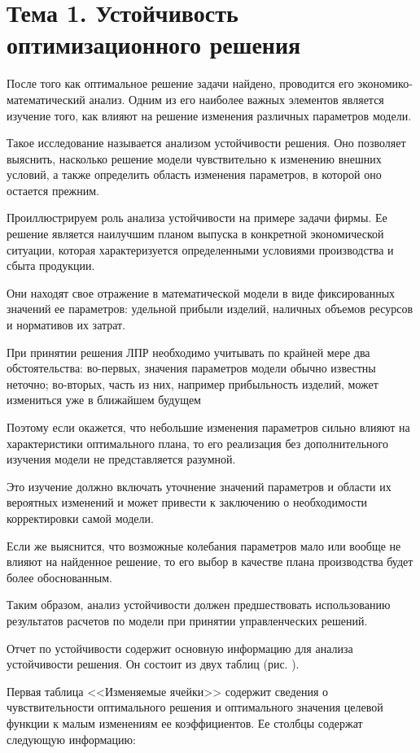 \section{Тема 1. Устойчивость оптимизационного решения}

После того как оптимальное решение задачи найдено, проводится его экономико-математический анализ. Одним из его наиболее важных элементов является изучение того, как влияют на решение изменения различных параметров модели.

Такое исследование называется анализом устойчивости решения. Оно позволяет выяснить, насколько решение модели чувствительно к изменению внешних условий, а также определить область изменения параметров, в которой оно остается прежним.

Проиллюстрируем роль анализа устойчивости на примере задачи фирмы. Ее решение является наилучшим планом выпуска в конкретной экономической ситуации, которая характеризуется определенными условиями производства и сбыта продукции.

Они находят свое отражение в математической модели в виде фиксированных значений ее параметров: удельной прибыли изделий, наличных объемов ресурсов и нормативов их затрат.

При принятии решения ЛПР необходимо учитывать по крайней мере два обстоятельства: во-первых, значения параметров модели обычно известны неточно; во-вторых, часть из них, например прибыльность изделий, может измениться уже в ближайшем будущем

Поэтому если окажется, что небольшие изменения параметров сильно влияют на характеристики оптимального плана, то его реализация без дополнительного изучения модели не представляется разумной.

Это изучение должно включать уточнение значений параметров и области их вероятных изменений и может привести к заключению о необходимости корректировки самой модели.

Если же выяснится, что возможные колебания параметров мало или вообще не влияют на найденное решение, то его выбор в качестве плана производства будет более обоснованным.

Таким образом, анализ устойчивости должен предшествовать использованию результатов расчетов по модели при принятии управленческих решений.

Отчет по устойчивости содержит основную информацию для анализа устойчивости решения. Он состоит из двух таблиц (рис. ).

Первая таблица <<Изменяемые ячейки>> содержит сведения о чувствительности оптимального решения и оптимального значения целевой функции к малым изменениям ее коэффициентов. Ее столбцы содержат следующую информацию:

